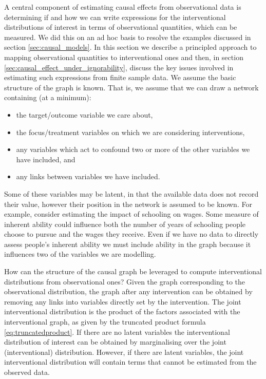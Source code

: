 \documentclass[11pt,a4paper,twoside]{report}
\theoremstyle{plain}
\theoremstyle{definition}
\begin{document}
A central component of estimating causal effects from observational data is determining if and how we can write expressions for the interventional distributions of interest in terms of observational quantities, which can be measured. We did this on an ad hoc basis to resolve the examples discussed in section \ref{sec:causal_models}. In this section we describe a principled approach to mapping observational quantities to interventional ones and then, in section \ref{sec:causal_effect_under_ignorability}, discuss the key issues involved in estimating such expressions from finite sample data. We assume the basic structure of the graph is known. That is, we assume that we can draw a network containing (at a minimum):

\begin{itemize}
\item the target/outcome variable we care about,
\item the focus/treatment variables on which we are considering interventions,
\item any variables which act to confound two or more of the other variables we have included, and
\item any links between variables we have included. 
\end{itemize}

Some of these variables may be latent, in that the available data does not record their value, however their position in the network is assumed to be known. For example, consider estimating the impact of schooling on wages. Some measure of inherent ability could influence both the number of years of schooling people choose to pursue and the wages they receive. Even if we have no data to directly assess people's inherent ability we must include ability in the graph because it influences two of the variables we are modelling. 

How can the structure of the causal graph be leveraged to compute interventional distributions from observational ones? Given the graph corresponding to the observational distribution, the graph after any intervention can be obtained by removing any links into variables directly set by the intervention. The joint interventional distribution is the product of the factors associated with the interventional graph, as given by the truncated product formula \ref{eq:truncatedproduct}. If there are no latent variables the interventional distribution of interest can be obtained by marginalising over the joint (interventional) distribution. However, if there are latent variables, the joint interventional distribution will contain terms that cannot be estimated from the observed data. 
\end{document}
